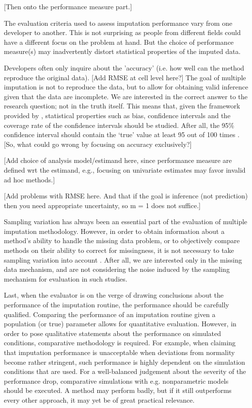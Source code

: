 \documentclass[bimj,fleqn]{w-art}
\theoremstyle{plain}
\theoremstyle{definition}
\begin{document}
[Then onto the performance measure part.]

The evaluation criteria used to assess imputation performance vary from one developer to another. This is not surprising as people from different fields could have a different focus on the problem at hand. But the choice of performance measure(s) may inadvertently distort statistical properties of the imputed data.

Developers often only inquire about the 'accuracy' (i.e. how well can the method reproduce the original data). [Add RMSE at cell level here?] The goal of multiple imputation is not to reproduce the data, but to allow for obtaining valid inference given that the data are incomplete. We are interested in the correct answer to the research question; not in the truth itself. This means that, given the framework provided by \citet{rubi87}, statistical properties such as bias, confidence intervals and the coverage rate of the confidence intervals should be studied. After all, the 95\% confidence interval should contain the `true' value at least 95 out of 100 times \citep[][p. 591]{neym34}. [So, what could go wrong by focusing on accuracy exclusively?]

[Add choice of analysis model/estimand here, since performance measure are defined wrt the estimand, e.g., focusing on univariate estimates may favor invalid ad hoc methods.]

[Add problems with RMSE here. And that if the goal is inference (not prediction) then you need appropriate uncertainty, so m = 1 does not suffice.]

Sampling variation has always been an essential part of the evaluation of multiple imputation methodology. However, in order to obtain information about a method's ability to handle the missing data problem, or to objectively compare methods on their ability to correct for missingness, it is not necessary to take sampling variation into account \citep{vink14}. After all, we are interested only in the missing data mechanism, and are not considering the noise induced by the sampling mechanism for evaluation in such studies.

Last, when the evaluator is on the verge of drawing conclusions about the performance of the imputation routine, the performance should be carefully qualified. Comparing the performance of an imputation routine given a population (or true) parameter allows for quantitative evaluation. However, in order to pose qualitative statements about the performance on simulated conditions, comparative methodology is required. For example, when claiming that imputation performance is unacceptable when deviations from normality become rather stringent, such performance is highly dependent on the simulation conditions that are used. For a well-balanced judgement about the severity of the performance drop, comparative simulations with e.g. nonparametric models should be executed. A method may perform badly, but if it still outperforms every other approach, it may yet be of great practical relevance.
\end{document}
